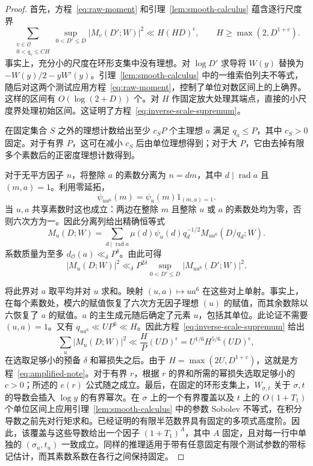 \documentclass[11pt,a4paper]{article}
\numberwithin{equation}{section}
\numberwithin{figure}{section}
\theoremstyle{definition}
\theoremstyle{remark}
\begin{document}
\begin{proof}
首先，方程~\eqref{eq:raw-moment} 和引理~\ref{lem:smooth-calculus} 蕴含逐行尺度界
\begin{equation}\label{eq:inverse-scale-supremum}
 \sum_{\substack{v\in\mathcal O\\0<q_v\le C H}}
       \sup_{0<D'\le D}|M_v(D';W)|^2
 \ll H(HD)^\epsilon,\qquad H\ge\max(2,D^{1+c}).
\end{equation}
事实上，充分小的尺度在环形支集中没有理想。对 \(\log D'\) 求导将 \(W(y)\) 替换为 \(-W(y)/2-yW'(y)\)。引理~\ref{lem:smooth-calculus} 中的一维索伯列夫不等式，随后对这两个测试应用方程~\eqref{eq:raw-moment}，控制了单位对数区间上的上确界。这样的区间有 \(O(\log(2+D))\) 个。对 \(H\) 作固定放大处理其端点，直接的小尺度界处理初始区间。这证明了方程~\eqref{eq:inverse-scale-supremum}。

在固定集合 \(S\) 之外的理想计数给出至少 \(c_S P\) 个主理想 \(a\) 满足 \(q_a\le P\)，其中 \(c_S>0\) 固定。对于有界 \(P\)，这可在减小 \(c_S\) 后由单位理想得到；对于大 \(P\)，它由去掉有限多个素数后的正密度理想计数得到。

对于无平方因子 \(n\)，将整除 \(a\) 的素数分离为 \(n=dm\)，其中 \(d\mid\operatorname{rad}a\) 且 \((m,a)=1\)。利用零延拓，
\[
 \psi_{ua^6}(m)=\psi_u(m)1_{(m,a)=1}.
\]
当 \(u,a\) 共享素数时这也成立：两边在整除 \(m\) 且整除 \(u\) 或 \(a\) 的素数处均为零，否则六次方为一。因此分离列给出精确恒等式
\begin{equation}\label{eq:sixth-power-column-identity}
 M_u(D;W)=\sum_{d\mid\operatorname{rad}a}
       \mu(d)\psi_u(d)q_d^{-1/2}M_{ua^6}(D/q_d;W).
\end{equation}
系数质量为至多 \(d_{\mathcal O}(a)\ll_\delta P^\delta\)。由此可得
\[
 |M_u(D;W)|^2\ll_\delta
 P^{2\delta}\sup_{0<D'\le D}|M_{ua^6}(D';W)|^2.
\]

将此界对 \(a\) 取平均并对 \(u\) 求和。映射 \((u,a)\mapsto ua^6\) 在这些对上单射。事实上，在每个素数处，模六的赋值恢复了六次方无因子理想 \((u)\) 的赋值，而其余数除以六恢复了 \(a\) 的赋值。\(a\) 的主生成元随后确定了元素 \(u\)，包括其单位。此论证不需要 \((u,a)=1\)。又有 \(q_{ua^6}\ll UP^6\ll H\)。因此方程~\eqref{eq:inverse-scale-supremum} 给出
\[
 \sum_u|M_u(D;W)|^2
 \ll \frac HP(UD)^\epsilon
 =U^{1/6}H^{5/6}(UD)^\epsilon,
\]
在选取足够小的预备 \(\delta\) 和幂损失之后。由于 \(H=\max(2U,D^{1+c})\)，这就是方程~\eqref{eq:amplified-note}。对于有界 \(r\)，根据 \(r\) 的界和所需的幂损失选取足够小的 \(c>0\)；所述的 \(e(r)\) 公式随之成立。最后，在固定的环形支集上，\(W_{\sigma,t}\) 关于 \(\sigma,t\) 的导数会插入 \(\log y\) 的有界幂次。在 \(\sigma\) 上的一个有界覆盖以及 \(t\) 上的 \(O(1+T_1)\) 个单位区间上应用引理~\ref{lem:smooth-calculus} 中的参数 Sobolev 不等式，在积分导数之前先对行矩求和。已经证明的有限半范数界具有固定的多项式高度阶。因此，该覆盖与这些导数给出一个因子 \((1+T_1)^A\)，其中 \(A\) 固定，且对每一行中单独的 \((\sigma_u,t_u)\) 一致成立。同样的推理适用于带有任意固定有限个测试参数的带标记估计，而其素数系数在各行之间保持固定。
\end{proof}
\end{document}
